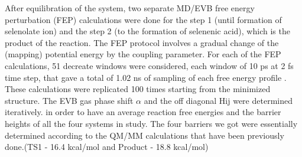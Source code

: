 \documentclass{article}
\begin{document}
After equilibration of the system, two separate MD/EVB free energy perturbation (FEP) calculations were done for the step 1 (until formation of selenolate ion) and the step 2 (to the formation of selenenic acid), which is the product of the reaction. The FEP protocol involves a gradual change of the (mapping) potential energy by the coupling parameter. For each of the FEP calculations, 51 decreate windows were considered, each window of 10 ps at 2 fs time step, that gave a total of 1.02 ns of sampling of each free energy profile . These calculations were replicated 100 times starting from the minimized structure. The EVB gas phase shift $\alpha$  and the off diagonal Hij were determined iteratively. in order to have an average reaction free energies and the barrier heights of all the four systems in study. The four barriers we got were essentially determined according to the QM/MM calculations that have been previously done.(TS1 - 16.4 kcal/mol and Product - 18.8 kcal/mol)


\medskip



\end{document}
